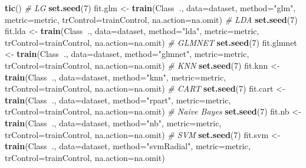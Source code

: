 \documentclass[]{book}
\newenvironment{Shaded}{\begin{snugshade}}{\end{snugshade}}
\newcommand{\CommentTok}[1]{\textcolor[rgb]{0.56,0.35,0.01}{\textit{#1}}}
\newcommand{\DataTypeTok}[1]{\textcolor[rgb]{0.13,0.29,0.53}{#1}}
\newcommand{\DecValTok}[1]{\textcolor[rgb]{0.00,0.00,0.81}{#1}}
\newcommand{\KeywordTok}[1]{\textcolor[rgb]{0.13,0.29,0.53}{\textbf{#1}}}
\newcommand{\NormalTok}[1]{#1}
\newcommand{\OperatorTok}[1]{\textcolor[rgb]{0.81,0.36,0.00}{\textbf{#1}}}
\newcommand{\StringTok}[1]{\textcolor[rgb]{0.31,0.60,0.02}{#1}}
\begin{document}
\begin{Shaded}
\begin{Highlighting}[]
\KeywordTok{tic}\NormalTok{()}
\CommentTok{# LG}
\KeywordTok{set.seed}\NormalTok{(}\DecValTok{7}\NormalTok{)}
\NormalTok{fit.glm <-}\StringTok{ }\KeywordTok{train}\NormalTok{(Class}\OperatorTok{~}\NormalTok{., }\DataTypeTok{data=}\NormalTok{dataset, }\DataTypeTok{method=}\StringTok{"glm"}\NormalTok{, }\DataTypeTok{metric=}\NormalTok{metric,}
                 \DataTypeTok{trControl=}\NormalTok{trainControl, }\DataTypeTok{na.action=}\NormalTok{na.omit)}
\CommentTok{# LDA}
\KeywordTok{set.seed}\NormalTok{(}\DecValTok{7}\NormalTok{)}
\NormalTok{fit.lda <-}\StringTok{ }\KeywordTok{train}\NormalTok{(Class}\OperatorTok{~}\NormalTok{., }\DataTypeTok{data=}\NormalTok{dataset, }\DataTypeTok{method=}\StringTok{"lda"}\NormalTok{, }\DataTypeTok{metric=}\NormalTok{metric,}
                 \DataTypeTok{trControl=}\NormalTok{trainControl, }\DataTypeTok{na.action=}\NormalTok{na.omit)}
\CommentTok{# GLMNET}
\KeywordTok{set.seed}\NormalTok{(}\DecValTok{7}\NormalTok{)}
\NormalTok{fit.glmnet <-}\StringTok{ }\KeywordTok{train}\NormalTok{(Class}\OperatorTok{~}\NormalTok{., }\DataTypeTok{data=}\NormalTok{dataset, }\DataTypeTok{method=}\StringTok{"glmnet"}\NormalTok{, }\DataTypeTok{metric=}\NormalTok{metric,}
                    \DataTypeTok{trControl=}\NormalTok{trainControl, }\DataTypeTok{na.action=}\NormalTok{na.omit)}
\CommentTok{# KNN}
\KeywordTok{set.seed}\NormalTok{(}\DecValTok{7}\NormalTok{)}
\NormalTok{fit.knn <-}\StringTok{ }\KeywordTok{train}\NormalTok{(Class}\OperatorTok{~}\NormalTok{., }\DataTypeTok{data=}\NormalTok{dataset, }\DataTypeTok{method=}\StringTok{"knn"}\NormalTok{, }\DataTypeTok{metric=}\NormalTok{metric, }
                 \DataTypeTok{trControl=}\NormalTok{trainControl, }\DataTypeTok{na.action=}\NormalTok{na.omit)}
\CommentTok{# CART}
\KeywordTok{set.seed}\NormalTok{(}\DecValTok{7}\NormalTok{)}
\NormalTok{fit.cart <-}\StringTok{ }\KeywordTok{train}\NormalTok{(Class}\OperatorTok{~}\NormalTok{., }\DataTypeTok{data=}\NormalTok{dataset, }\DataTypeTok{method=}\StringTok{"rpart"}\NormalTok{, }\DataTypeTok{metric=}\NormalTok{metric, }
                  \DataTypeTok{trControl=}\NormalTok{trainControl, }\DataTypeTok{na.action=}\NormalTok{na.omit)}
\CommentTok{# Naive Bayes}
\KeywordTok{set.seed}\NormalTok{(}\DecValTok{7}\NormalTok{)}
\NormalTok{fit.nb <-}\StringTok{ }\KeywordTok{train}\NormalTok{(Class}\OperatorTok{~}\NormalTok{., }\DataTypeTok{data=}\NormalTok{dataset, }\DataTypeTok{method=}\StringTok{"nb"}\NormalTok{, }\DataTypeTok{metric=}\NormalTok{metric, }
                \DataTypeTok{trControl=}\NormalTok{trainControl, }\DataTypeTok{na.action=}\NormalTok{na.omit)}
\CommentTok{# SVM}
\KeywordTok{set.seed}\NormalTok{(}\DecValTok{7}\NormalTok{)}
\NormalTok{fit.svm <-}\StringTok{ }\KeywordTok{train}\NormalTok{(Class}\OperatorTok{~}\NormalTok{., }\DataTypeTok{data=}\NormalTok{dataset, }\DataTypeTok{method=}\StringTok{"svmRadial"}\NormalTok{, }\DataTypeTok{metric=}\NormalTok{metric, }
                 \DataTypeTok{trControl=}\NormalTok{trainControl, }\DataTypeTok{na.action=}\NormalTok{na.omit)}


\end{Highlighting}
\end{Shaded}
\end{document}
